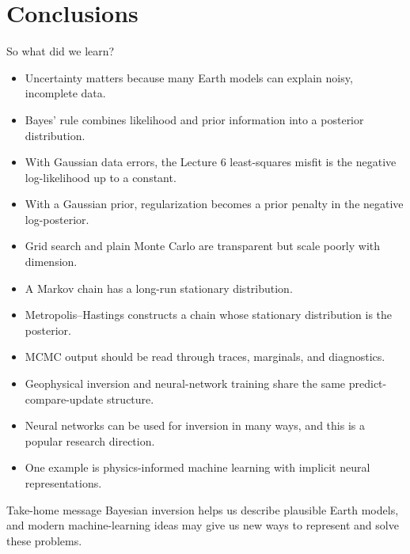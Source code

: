 \documentclass[aspectratio=169]{beamer}
\begin{document}
\section{Conclusions}

\begin{frame}{So what did we learn?}
\footnotesize

\begin{itemize}
    \item[--] Uncertainty matters because many Earth models can explain noisy, incomplete data.
    \item[--] Bayes' rule combines likelihood and prior information into a posterior distribution.
    \item[--] With Gaussian data errors, the Lecture 6 least-squares misfit is the negative log-likelihood up to a constant.
    \item[--] With a Gaussian prior, regularization becomes a prior penalty in the negative log-posterior.
    \item[--] Grid search and plain Monte Carlo are transparent but scale poorly with dimension.
    \item[--] A Markov chain has a long-run stationary distribution.
    \item[--] Metropolis--Hastings constructs a chain whose stationary distribution is the posterior.
    \item[--] MCMC output should be read through traces, marginals, and diagnostics.
    \item[--] Geophysical inversion and neural-network training share the same predict-compare-update structure.
    \item[--] Neural networks can be used for inversion in many ways, and this is a popular research direction.
    \item[--] One example is physics-informed machine learning with implicit neural representations.
\end{itemize}

\begin{alertblock}{Take-home message}
Bayesian inversion helps us describe plausible Earth models, and modern machine-learning ideas may give us new ways to represent and solve these problems.
\end{alertblock}
\end{frame}
\end{document}
